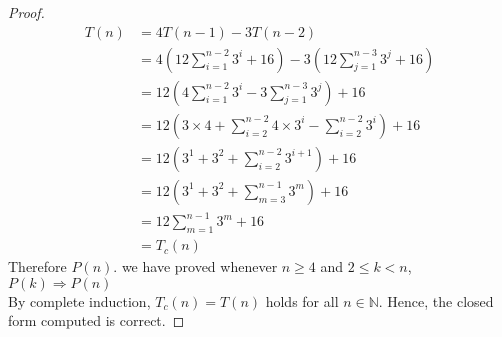 \documentclass[11pt]{article}
\theoremstyle{plain}%
\theoremstyle{definition}
\theoremstyle{remark}
\newcommand{\N}{\mathbb{N}}
\begin{document}
\begin{enumerate}
\begin{proof}
    \begin{align*}
      T(n) &= 4T(n-1) - 3T(n-2)\tag{by recurrence relationship}\\
      &= 4(12\sum_{i=1}^{n-2}{3^i} + 16) - 3(12\sum_{j=1}^{n-3}{3^j} + 16) \tag{by I.H. as 2$\leq n-2<n$ and 2$\leq n-1< n$ because $n\geq 4$} \\
      &= 12(4\sum_{i=1}^{n-2}{3^i} - 3\sum_{j=1}^{n-3}{3^j}) + 16\\
      &= 12(3\times 4 + \sum_{i=2}^{n-2}{4\times 3^i} - \sum_{i=2}^{n-2}{3^i}) + 16 \tag{extract term at $i=2$ for the first summation and let $i = j+1$ in the second summation}\\
      &= 12(3^1 + 3^2 + \sum_{i=2}^{n-2}{3^{i+1}}) + 16 \tag{by summation identity}\\
      &= 12(3^1 + 3^2 + \sum_{m=3}^{n-1}{3^{m}}) + 16 \tag{let $m=i+1$}\\
      &= 12\sum_{m=1}^{n-1}{3^{m}} + 16 \\
      &= T_c(n)
    \end{align*}
    Therefore $P(n)$. we have proved whenever $n\geq 4$ and $2\leq k < n$, $P(k)\Rightarrow P(n)$\\
    By complete induction, $T_c(n) = T(n)$ holds for all $n\in \N$. Hence, the closed form computed is correct.
  \end{proof}
\end{enumerate}
\end{document}
